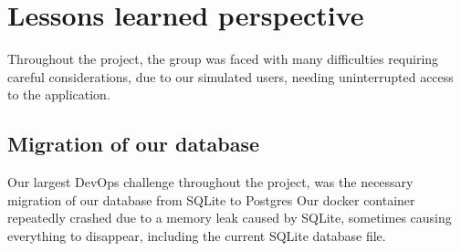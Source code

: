 \section{Lessons learned perspective}






Throughout the project, the group was faced with many difficulties requiring careful considerations, due to our simulated users, needing uninterrupted access to the application.
\subsection{Migration of our database}
Our largest DevOps challenge throughout the project, was the necessary migration of our database from SQLite to Postgres %
Our docker container repeatedly crashed due to a memory leak caused by SQLite, sometimes causing everything to disappear, including the current SQLite database file. \\

